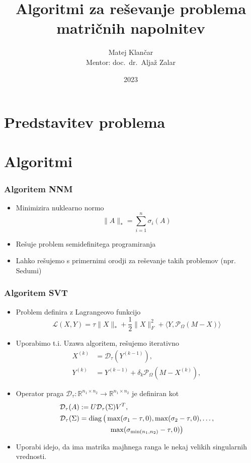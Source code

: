 \documentclass{beamer}
\title{Algoritmi za reševanje problema matričnih napolnitev}
\author[Matej Klančar]{Matej Klančar \\ \vspace{0.2cm} Mentor: doc.\ dr.\ Aljaž Zalar}
\date{2023}
\newcommand{\nnorm}[1]{\lVert#1\rVert_*}
\newcommand{\fnorm}[1]{\lVert#1\rVert_F}
\newcommand{\proj}{\mathcal{P}_\Omega}
\newcommand{\shrink}{\mathcal{D}}
\newcommand{\trOp}[2]{\langle #1, #2 \rangle}
\DeclareMathOperator{\diag}{diag}
\begin{document}
\frame{\titlepage}
\section{Predstavitev problema}

\section{Algoritmi}
\begin{frame}
  \frametitle{Algoritem NNM}
  \begin{itemize}
    \item Minimizira \alert{nuklearno normo} \[
      \nnorm{A} = \sum_{i = 1}^{n} \sigma_i(A)
    \]
    \item Rešuje problem semidefinitega programiranja
    \item Lahko rešujemo s primernimi orodji za reševanje takih problemov (npr. Sedumi)
  \end{itemize}
\end{frame}

\begin{frame}
  \frametitle{Algoritem SVT}
  \begin{itemize}
    \item Problem definira z Lagrangeovo funkcijo \[
      \mathcal{L}(X, Y) = \tau \nnorm{X} + \frac{1}{2}\fnorm{X}^2 + \trOp{Y}{\proj(M-X)} 
    \]
    \item Uporabimo t.i. Uzawa algoritem, rešujemo iterativno
    \begin{align*}
              X^{(k)} &= \shrink_\tau(Y^{(k-1)}), \\
              Y^{(k)} &= Y^{(k-1)} + \delta_k \proj(M - X^{(k)}), 
      \end{align*}
      \item \alert{Operator praga} $\shrink_\tau: \mathbb{R}^{n_1 \times n_2} \rightarrow \mathbb{R}^{n_1 \times n_2}$ je definiran kot
      \begin{align*}
          \shrink_\tau(A) &:= U \shrink_\tau(\Sigma) V^T, \\ \shrink_\tau(\Sigma) &= \diag\big(\max(\sigma_1 - \tau, 0),
          \max(\sigma_2-\tau,0),\ldots,\\
          &\hspace{1.5cm}
          \max(\sigma_{\min(n_1,n_2)}-\tau,0)\big)
      \end{align*}
      \item Uporabi idejo, da ima matrika majhnega ranga le nekaj velikih singularnih vrednosti.
  \end{itemize}
\end{frame}
\end{document}

